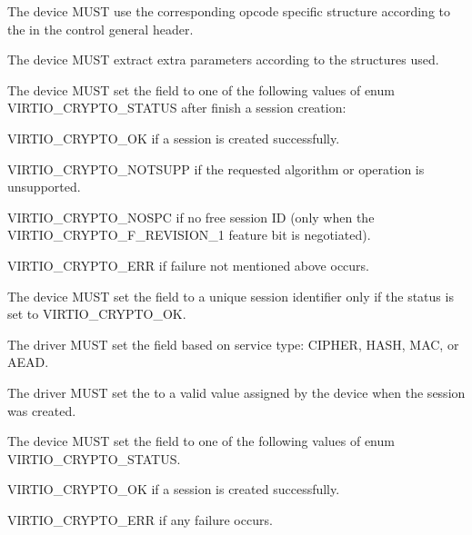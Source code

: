 
\begin{itemize*}
\item The device MUST use the corresponding opcode specific structure according to the
     in the control general header.
\item The device MUST extract extra parameters according to the structures used.
\item The device MUST set the  field to one of the following values of enum
    VIRTIO_CRYPTO_STATUS after finish a session creation:
\begin{itemize*}
\item VIRTIO_CRYPTO_OK if a session is created successfully.
\item VIRTIO_CRYPTO_NOTSUPP if the requested algorithm or operation is unsupported.
\item VIRTIO_CRYPTO_NOSPC if no free session ID (only when the VIRTIO_CRYPTO_F_REVISION_1
    feature bit is negotiated).
\item VIRTIO_CRYPTO_ERR if failure not mentioned above occurs.
\end{itemize*}
\item The device MUST set the  field to a unique session identifier only
    if the status is set to VIRTIO_CRYPTO_OK.
\end{itemize*}


\begin{itemize*}
\item The driver MUST set the  field based on service type: CIPHER, HASH, MAC, or AEAD.
\item The driver MUST set the  to a valid value assigned by the device
    when the session was created.
\end{itemize*}


\begin{itemize*}
\item The device MUST set the  field to one of the following values of enum VIRTIO_CRYPTO_STATUS.
\begin{itemize*}
\item VIRTIO_CRYPTO_OK if a session is created successfully.
\item VIRTIO_CRYPTO_ERR if any failure occurs.
\end{itemize*}
\end{itemize*}


